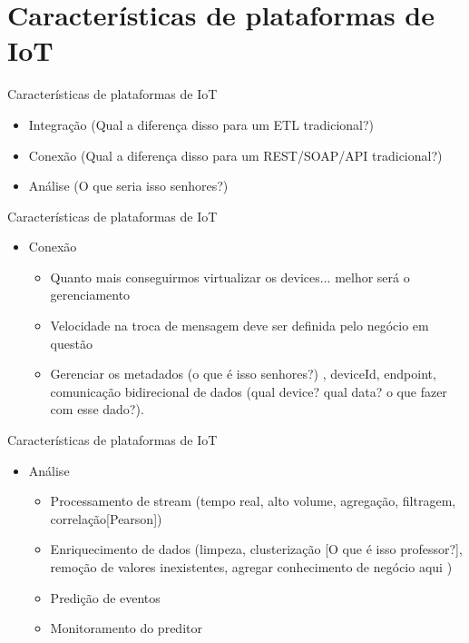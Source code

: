 \section{Características de plataformas de IoT}


\begin{frame}
	\begin{block}{Características de plataformas de IoT}
		 \begin{itemize}
			  \item Integração (Qual a diferença disso para um ETL tradicional?)
			  \item Conexão (Qual a diferença disso para um REST/SOAP/API tradicional?)
			  \item Análise (O que seria isso senhores?)
		  \end{itemize}
	\end{block}
\end{frame}

\begin{frame}
	\begin{block}{Características de plataformas de IoT}
		 \begin{itemize}
			  \item Conexão 
		 		\begin{itemize}
		 			\item Quanto mais conseguirmos virtualizar os devices... melhor será o gerenciamento
		 			\item Velocidade na troca de mensagem deve ser definida pelo negócio em questão
		 			\item Gerenciar os metadados (o que é isso senhores?)	, deviceId, endpoint, comunicação bidirecional de dados (qual device? qual data? o que fazer com esse dado?).
		  		\end{itemize}
		  \end{itemize}
	\end{block}
\end{frame}


\begin{frame}
	\begin{block}{Características de plataformas de IoT}
		 \begin{itemize}
			  \item Análise 
		 		\begin{itemize}
		 			\item Processamento de stream (tempo real, alto volume, agregação, filtragem, correlação[Pearson])
		 			\item Enriquecimento de dados (limpeza, clusterização [O que é isso professor?], remoção de valores inexistentes, agregar conhecimento de negócio aqui )
		 			\item Predição de eventos
		 			\item Monitoramento do preditor
		  		\end{itemize}
		  \end{itemize}
	\end{block}
\end{frame}


